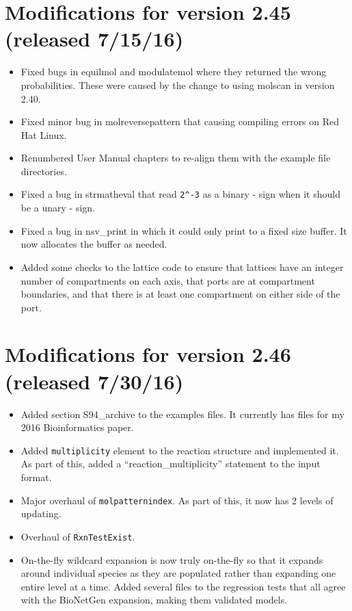 \documentclass {scrbook}
\newcommand {\ttt} {\texttt}
\begin{document}
\section{Modifications for version 2.45 (released 7/15/16)}
\begin{itemize}
\item Fixed bugs in equilmol and modulatemol where they returned the wrong probabilities. These were caused by the change to using molscan in version 2.40.
\item Fixed minor bug in molreversepattern that causing compiling errors on Red Hat Linux.
\item Renumbered User Manual chapters to re-align them with the example file directories.
\item Fixed a bug in strmatheval that read \verb|2^-3| as a binary - sign when it should be a unary - sign.
\item Fixed a bug in nsv\_print in which it could only print to a fixed size buffer. It now allocates the buffer as needed.
\item Added some checks to the lattice code to ensure that lattices have an integer number of compartments on each axis, that ports are at compartment boundaries, and that there is at least one compartment on either side of the port.
\end{itemize}

\section{Modifications for version 2.46 (released 7/30/16)}
\begin{itemize}
\item Added section S94\_archive to the examples files. It currently has files for my 2016 Bioinformatics paper.
\item Added \ttt{multiplicity} element to the reaction structure and implemented it. As part of this, added a ``reaction\_multiplicity'' statement to the input format.
\item Major overhaul of \ttt{molpatternindex}. As part of this, it now has 2 levels of updating.
\item Overhaul of \ttt{RxnTestExist}.
\item On-the-fly wildcard expansion is now truly on-the-fly so that it expands around individual species as they are populated rather than expanding one entire level at a time. Added several files to the regression tests that all agree with the BioNetGen expansion, making them validated models.
\end{itemize}
\end{document}
